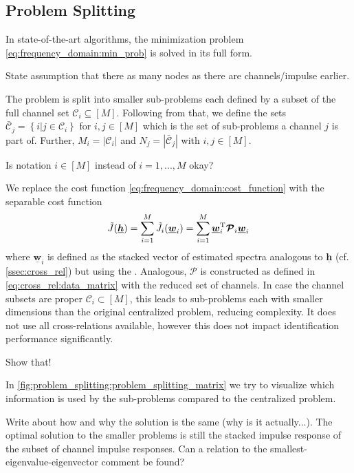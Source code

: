 \documentclass{article}
\newcommand{\hf}{\underline{\bm{h}}}
\newcommand{\wf}{\underline{\bm{w}}}
\newcommand{\aRhof}{\bm{\mathcal{P}}}
\newcommand{\Cset}{\mathcal{C}}
\newcommand{\Csetb}{\bar{\mathcal{C}}}
\begin{document}
\subsection{Problem Splitting}
\label{ssec:problem_splitting}
In state-of-the-art algorithms, the minimization problem \eqref{eq:frequency_domain:min_prob} is solved in its full form.
\begin{note}
    State assumption that there as many nodes as there are channels/impulse earlier.
\end{note}
The problem is split into smaller sub-problems each defined by a subset of the full channel set \(\Cset_i \subseteq [M]\).
Following from that, we define the sets \(\Csetb_j = \left\{ i \vert j \in \Cset_i \right\}\) for \(i,j \in [M]\) which is the set of sub-problems a channel  \(j\) is part of. 
Further, \(M_i = \left| \Cset_i \right| \) and \(N_j = \left| \Csetb_j \right| \) with \(i,j \in [M]\).
\begin{attention}
    Is notation \(i \in [M]\) instead of \(i=1,...,M\) okay?
\end{attention}
We replace the cost function \eqref{eq:frequency_domain:cost_function} with the separable cost function 
\begin{equation}
    \tilde{J}(\hf) = \sum_{i=1}^M \tilde{J}_i(\wf_i)  = \sum_{i=1}^M \wf_i^\T \aRhof_i \wf_i
\end{equation}
where \(\wf_i\) is defined as the stacked vector of estimated spectra analogous to \(\hf\) (cf. \autoref{ssec:cross_rel}) but using the .
Analogous, \(\aRhof\) is constructed as defined in \eqref{eq:cross_rel:data_matrix} with the reduced set of channels.
In case the channel subsets are proper \(\Cset_i \subset [M]\), this leads to sub-problems each with smaller dimensions than the original centralized problem, reducing complexity.
It does not use all cross-relations available, however this does not impact identification performance significantly. 
\begin{attention}
    Show that!
\end{attention}
In \autoref{fig:problem_splitting:problem_splitting_matrix} we try to visualize which information is used by the sub-problems compared to the centralized problem.
\begin{attention}
    Write about how and why the solution is the same (why is it actually...). The optimal solution to the smaller problems is still the stacked impulse response of the subset of channel impulse responses. Can a relation to the smallest-eigenvalue-eigenvector comment be found?
\end{attention}
\end{document}
